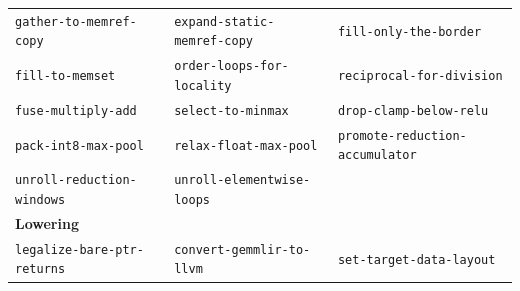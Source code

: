 \documentclass[runningheads]{llncs}
\begin{document}
\begin{table}[t]
\begin{tabular}{|l|l|l|}
\texttt{gather-to-memref-copy} & \texttt{expand-static-memref-copy} & \texttt{fill-only-the-border} \\
\texttt{fill-to-memset} & \texttt{order-loops-for-locality} & \texttt{reciprocal-for-division} \\
\texttt{fuse-multiply-add} & \texttt{select-to-minmax} & \texttt{drop-clamp-below-relu} \\
\texttt{pack-int8-max-pool} & \texttt{relax-float-max-pool} & \texttt{promote-reduction-accumulator} \\
\texttt{unroll-reduction-windows} & \texttt{unroll-elementwise-loops} &  \\
\hline
\multicolumn{3}{|l|}{\textbf{Lowering}} \\
\hline
\texttt{legalize-bare-ptr-returns} & \texttt{convert-gemmlir-to-llvm} & \texttt{set-target-data-layout} \\
\hline
\end{tabular}
\end{table}
\end{document}
